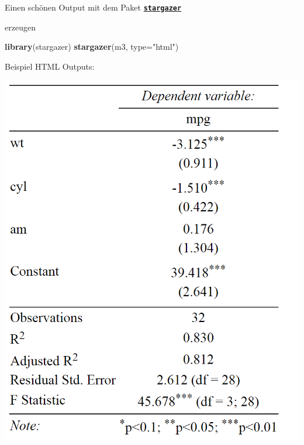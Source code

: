 \documentclass[ignorenonframetext,]{beamer}
\newenvironment{Shaded}{\begin{snugshade}}{\end{snugshade}}
\newcommand{\KeywordTok}[1]{\textcolor[rgb]{0.13,0.29,0.53}{\textbf{#1}}}
\newcommand{\DataTypeTok}[1]{\textcolor[rgb]{0.13,0.29,0.53}{#1}}
\newcommand{\StringTok}[1]{\textcolor[rgb]{0.31,0.60,0.02}{#1}}
\newcommand{\NormalTok}[1]{#1}
\begin{document}
\begin{frame}[fragile]{Einen schönen Output mit dem Paket
\href{https://cran.r-project.org/web/packages/stargazer/vignettes/stargazer.pdf}{\textbf{\texttt{stargazer}}}}

erzeugen

\begin{Shaded}
\begin{Highlighting}[]
\KeywordTok{library}\NormalTok{(stargazer)}
\KeywordTok{stargazer}\NormalTok{(m3, }\DataTypeTok{type=}\StringTok{"html"}\NormalTok{)}
\end{Highlighting}
\end{Shaded}

\begin{block}{Beispiel HTML Outputs:}

\includegraphics{figure/stargazertabex.PNG}

\end{block}

\end{frame}
\end{document}
